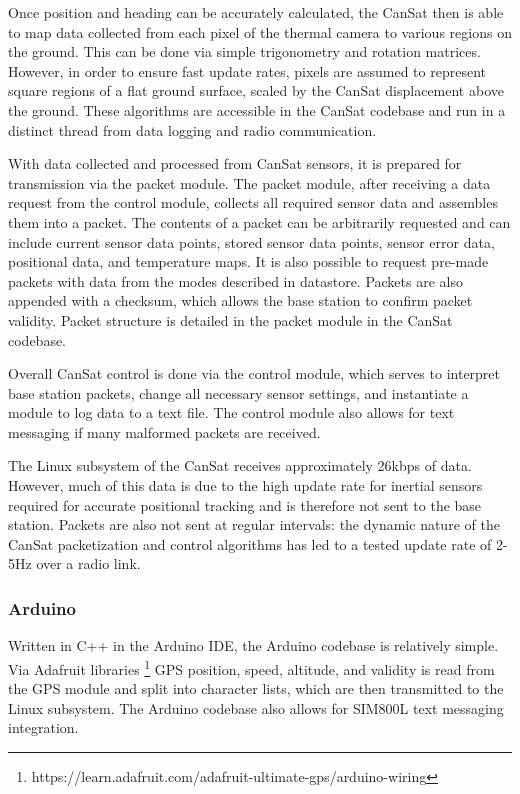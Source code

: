 \documentclass[]{report}
\begin{document}
		Once position and heading can be accurately calculated, the CanSat then is able to map data collected from each pixel of the thermal camera to various regions on the ground. This can be done via simple trigonometry and rotation matrices. However, in order to ensure fast update rates, pixels are assumed to represent square regions of a flat ground surface, scaled by the CanSat displacement above the ground. These algorithms are accessible in the CanSat codebase and run in a distinct thread from data logging and radio communication. 
		
		With data collected and processed from CanSat sensors, it is prepared for transmission via the packet module. The packet module, after receiving a data request from the control module, collects all required sensor data and assembles them into a packet. The contents of a packet can be arbitrarily requested and can include current sensor data points, stored sensor data points, sensor error data, positional data, and temperature maps. It is also possible to request pre-made packets with data from the modes described in datastore. Packets are also appended with a checksum, which allows the base station to confirm packet validity. Packet structure is detailed in the packet module in the CanSat codebase. 
		
		Overall CanSat control is done via the control module, which serves to interpret base station packets, change all necessary sensor settings, and instantiate a module to log data to a text file. The control module also allows for text messaging if many malformed packets are received.
		
		The Linux subsystem of the CanSat receives approximately 26kbps of data. However, much of this data is due to the high update rate for inertial sensors required for accurate positional tracking and is therefore not sent to the base station. Packets are also not sent at regular intervals: the dynamic nature of the CanSat packetization and control algorithms has led to a tested update rate of 2-5Hz over a radio link.
		
		\subsubsection{Arduino}
		Written in C++ in the Arduino IDE, the Arduino codebase is relatively simple. Via Adafruit libraries \footnote{https://learn.adafruit.com/adafruit-ultimate-gps/arduino-wiring} GPS position, speed, altitude, and validity is read from the GPS module and split into character lists, which are then transmitted to the Linux subsystem. The Arduino codebase also allows for SIM800L text messaging integration.
		
\end{document}
